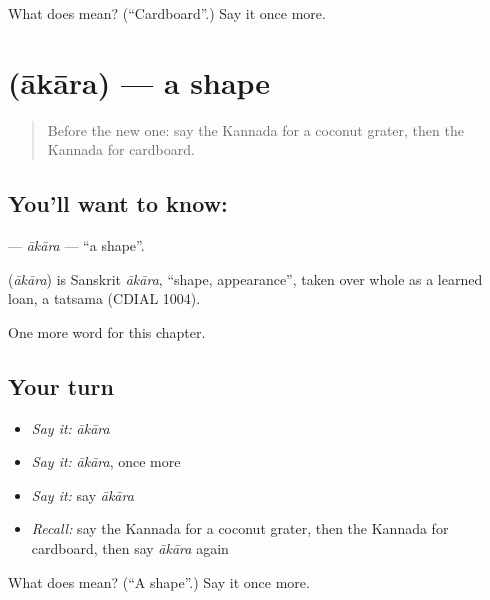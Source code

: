 \begin{tcolorbox}[breakable,colback=teal!4,colframe=teal!35!black,title={Before you move on}]
What does  mean? (\textquotedblleft{}Cardboard\textquotedblright{}.) Say it once more.
\end{tcolorbox}
\section[\texorpdfstring{\kn{ಆಕಾರ} (ākāra)}{ಆಕಾರ (ākāra)}]{ (ākāra) — a shape}

\label{lesson:KA-C193-akara}



\begin{quote}
Before the new one: say the Kannada for a coconut grater, then the Kannada for cardboard.
\end{quote}

\subsection*{You'll want to know: }
\textbf{} — \emph{ākāra} — \textquotedblleft{}a shape\textquotedblright{}.

\begin{cousinweb}
\textbf{} (\emph{ākāra}) is Sanskrit \emph{ākāra}, \textquotedblleft{}shape, appearance\textquotedblright{}, taken over whole as a learned loan, a tatsama (CDIAL 1004).
\end{cousinweb}

\begin{grammarlens}[title={What you've built}]
One more word for this chapter.
\end{grammarlens}

\subsection*{Your turn}
\begin{itemize}
\raggedright
  \item \emph{Say it:} \emph{ākāra}
  \item \emph{Say it:} \emph{ākāra}, once more
  \item \emph{Say it:} say \emph{ākāra}
  \item \emph{Recall:} say the Kannada for a coconut grater, then the Kannada for cardboard, then say \emph{ākāra} again
\end{itemize}

\begin{tcolorbox}[breakable,colback=teal!4,colframe=teal!35!black,title={Before you move on}]
What does  mean? (\textquotedblleft{}A shape\textquotedblright{}.) Say it once more.
\end{tcolorbox}
